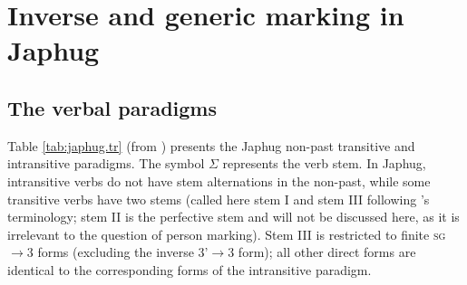 \documentclass[oneside,a4paper,11pt]{article}
\newcommand{\ro}{$\Sigma$}
\begin{document}
\section{Inverse and generic marking in Japhug} \label{sec:japhug}
\subsection{The verbal paradigms}
Table \ref{tab:japhug.tr} (from  \citealt{jacques10inverse}) presents the Japhug non-past transitive and intransitive paradigms. The symbol \ro{} represents the verb stem. In Japhug, intransitive verbs do not have stem alternations in the non-past, while some transitive verbs have two stems (called here stem I and stem III following \citealt{jackson00sidaba}'s terminology; stem II is the perfective stem and will not be discussed here, as it is irrelevant to the question of person marking). Stem III is restricted to finite \textsc{sg}$\rightarrow$3 forms (excluding the inverse 3'$\rightarrow$3 form); all other direct forms are identical to the corresponding forms of the intransitive paradigm.
\end{document}
